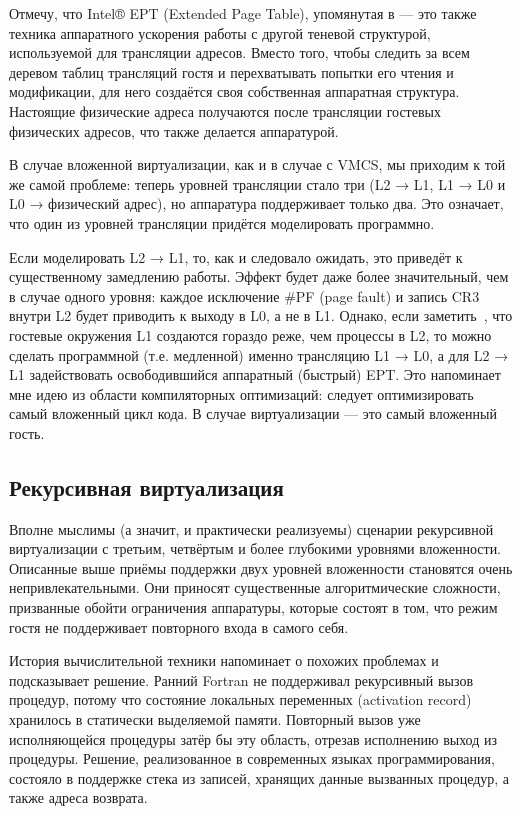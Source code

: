 Отмечу, что Intel® EPT (\abbr Extended Page Table), упомянутая в — это также техника аппаратного ускорения работы с другой теневой структурой, используемой для трансляции адресов. Вместо того, чтобы следить за всем деревом таблиц трансляций гостя и перехватывать попытки его чтения и модификации, для него создаётся своя собственная аппаратная структура. Настоящие физические адреса получаются после трансляции гостевых физических адресов, что также делается аппаратурой.

В случае вложенной виртуализации, как и в случае с VMCS, мы приходим к той же самой проблеме: теперь уровней трансляции стало три (L2 → L1, L1 → L0 и L0 → физический адрес), но аппаратура поддерживает только два. Это означает, что один из уровней трансляции придётся моделировать программно.

Если моделировать L2 → L1, то, как и следовало ожидать, это приведёт к существенному замедлению работы. Эффект будет даже более значительный, чем в случае одного уровня: каждое исключение \#PF (\abbr page fault) и запись CR3 внутри L2 будет приводить к выходу в L0, а не в L1. Однако, если заметить \cite{nested-ept-kvm-2013}, что гостевые окружения L1 создаются гораздо реже, чем процессы в L2, то можно сделать программной (т.е. медленной) именно трансляцию L1 → L0, а для L2 → L1 задействовать освободившийся аппаратный (быстрый) EPT. Это напоминает мне идею из области компиляторных оптимизаций: следует оптимизировать самый вложенный цикл кода. В случае виртуализации — это самый вложенный гость.

\subsection{Рекурсивная виртуализация}

Вполне мыслимы (а значит, и практически реализуемы) сценарии рекурсивной виртуализации с третьим, четвёртым и более глубокими уровнями вложенности. Описанные выше приёмы поддержки двух уровней вложенности становятся очень непривлекательными. Они приносят существенные алгоритмические сложности, призванные обойти ограничения аппаратуры, которые состоят в том, что режим гостя не поддерживает повторного входа в самого себя.

История вычислительной техники напоминает о похожих проблемах и подсказывает решение. Ранний Fortran не поддерживал рекурсивный вызов процедур, потому что состояние локальных переменных (activation record) хранилось в статически выделяемой памяти. Повторный вызов уже исполняющейся процедуры затёр бы эту область, отрезав исполнению выход из процедуры. Решение, реализованное в современных языках программирования, состояло в поддержке стека из записей, хранящих данные вызванных процедур, а также адреса возврата.

